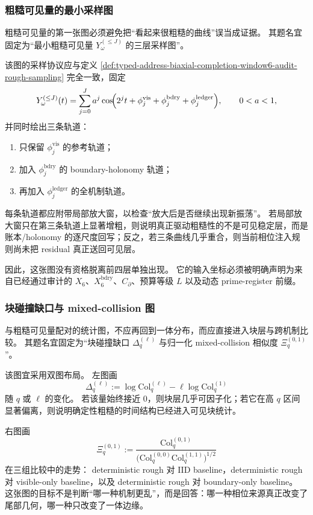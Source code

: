 \subsubsection{粗糙可见量的最小采样图}\label{subsubsec:typed-address-biaxial-completion-window6-figure-rough-visibility}
粗糙可见量的第一张图必须避免把“看起来很粗糙的曲线”误当成证据。
其题名宜固定为“最小粗糙可见量 \(Y_\omega^{(\le J)}\) 的三层采样图”。

该图的采样协议应与定义 \ref{def:typed-address-biaxial-completion-window6-audit-rough-sampling} 完全一致，固定
\[
Y_\omega^{(\le J)}(t)
=
\sum_{j=0}^{J} a^j
\cos\!\Bigl(
2^j t+\phi_j^{\mathrm{vis}}+\phi_j^{\mathrm{bdry}}+\phi_j^{\mathrm{ledger}}
\Bigr),
\qquad 0<a<1,
\]
并同时绘出三条轨道：
\begin{enumerate}
  \item 只保留 \(\phi_j^{\mathrm{vis}}\) 的参考轨道；
  \item 加入 \(\phi_j^{\mathrm{bdry}}\) 的 boundary-holonomy 轨道；
  \item 再加入 \(\phi_j^{\mathrm{ledger}}\) 的全机制轨道。
\end{enumerate}
每条轨道都应附带局部放大窗，以检查“放大后是否继续出现新振荡”。
若局部放大窗只在第三条轨道上显著增粗，则说明真正驱动粗糙性的不是可见稳定层，而是账本/holonomy 的逐尺度回写；反之，若三条曲线几乎重合，则当前相位注入规则尚未把 residual 真正送回可见层。

因此，这张图没有资格脱离前四层单独出现。
它的输入坐标必须被明确声明为来自已经通过审计的 \(X_6\)、\(X_6^{\mathrm{bdry}}\)、\(C_{\partial}\)、预算等级 \(L\) 以及动态 prime-register 前缀。

\subsubsection{块碰撞缺口与 mixed-collision 图}\label{subsubsec:typed-address-biaxial-completion-window6-figure-block-collision}
与粗糙可见量配对的统计图，不应再回到一体分布，而应直接进入块层与跨机制比较。
其题名宜固定为“块碰撞缺口 \(\Delta_q^{(\ell)}\) 与归一化 mixed-collision 相似度 \(\Xi_q^{(0,1)}\)”。

该图宜采用双图布局。
左图画
\[
\Delta_q^{(\ell)}
:=
\log \mathrm{Col}_q^{(\ell)}
-\ell\log \mathrm{Col}_q^{(1)}
\]
随 \(q\) 或 \(\ell\) 的变化。
若该量始终接近 \(0\)，则块层几乎可因子化；若它在高 \(q\) 区间显著偏离，则说明确定性粗糙的时间结构已经进入可见块统计。

右图画
\[
\Xi_q^{(0,1)}
:=
\frac{\mathrm{Col}_q^{(0,1)}}
{\bigl(\mathrm{Col}_q^{(0,0)}\mathrm{Col}_q^{(1,1)}\bigr)^{1/2}}
\]
在三组比较中的走势：
deterministic rough 对 IID baseline，deterministic rough 对 visible-only baseline，以及 deterministic rough 对 boundary-only baseline。
这张图的目标不是判断“哪一种机制更乱”，而是回答：哪一种相位来源真正改变了尾部几何，哪一种只改变了一体边缘。

